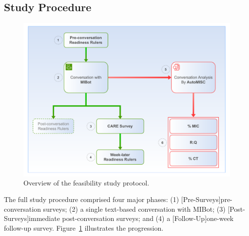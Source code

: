 \subsection{Study Procedure}
\begin{figure}[ht]
    \centering
    \includegraphics[width=0.9\linewidth]{fig/feasibility_study_flow.pdf}
    \caption{Overview of the feasibility study protocol.}
    \label{fig:study-flow}
\end{figure}

The full study procedure comprised four major phases: (1) [Pre-Surveys]pre-conversation surveys; (2) a single text-based conversation with MIBot; (3) [Post-Surveys]immediate post-conversation surveys; and (4) a [Follow-Up]one-week follow-up survey. Figure~\ref{fig:study-flow} illustrates the progression.



